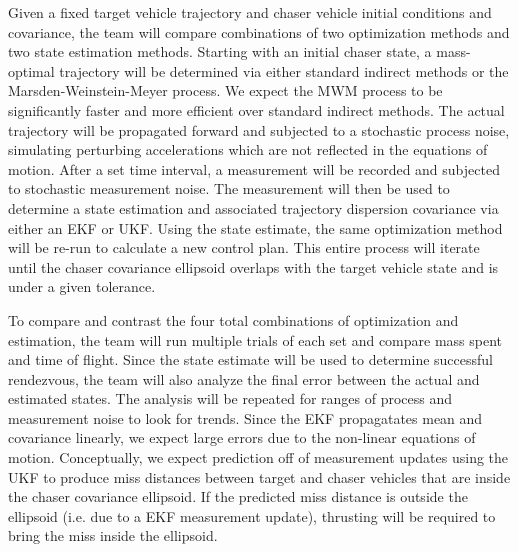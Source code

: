 \documentclass[a4paper]{article}
\newcommand*\diff{\mathop{}\!\mathrm{d}}
\begin{document}
Given a fixed target vehicle trajectory and chaser vehicle initial conditions and covariance, the team will compare combinations of two optimization methods and two state estimation methods. Starting with an initial chaser state, a mass-optimal trajectory will be determined via either standard indirect methods or the Marsden-Weinstein-Meyer process. We expect the MWM process to be significantly faster and more efficient over standard indirect methods. The actual trajectory will be propagated forward and subjected to a stochastic process noise, simulating perturbing accelerations which are not reflected in the equations of motion. After a set time interval, a measurement will be recorded and subjected to stochastic measurement noise. The measurement will then be used to determine a state estimation and associated trajectory dispersion covariance via either an EKF or UKF. Using the state estimate, the same optimization method will be re-run to calculate a new control plan. This entire process will iterate until the chaser covariance ellipsoid overlaps with the target vehicle state and is under a given tolerance.

To compare and contrast the four total combinations of optimization and estimation, the team will run multiple trials of each set and compare mass spent and time of flight. Since the state estimate will be used to determine successful rendezvous, the team will also analyze the final error between the actual and estimated states. The analysis will be repeated for ranges of process and measurement noise to look for trends. Since the EKF propagatates mean and covariance linearly, we expect large errors due to the non-linear equations of motion. Conceptually, we expect prediction off of measurement updates using the UKF to produce miss distances between target and chaser vehicles that are inside the chaser covariance ellipsoid. If the predicted miss distance is outside the ellipsoid (i.e. due to a EKF measurement update), thrusting will be required to bring the miss inside the ellipsoid.


\end{document}
